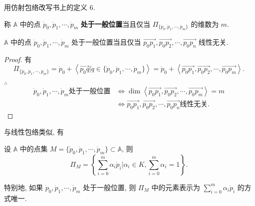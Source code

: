 \documentclass[color=black,device=normal,lang=cn,mode=geye]{elegantnote}
\begin{document}
用仿射包络改写书上的定义 6.
\begin{definition}[书上的定义 6]
    称 $\mathbb{A}$ 中的点 $\dot{p}_0,\dot{p}_1,\cdots,\dot{p}_m$ \textbf{处于一般位置}当且仅当 $\varPi_{\{\dot{p}_0,\dot{p}_1,\cdots,\dot{p}_m\}}$ 的维数为 $m$.
\end{definition}
\begin{theorem}
    $\mathbb{A}$ 中的点 $\dot{p}_0,\dot{p}_1,\cdots,\dot{p}_m$ 处于一般位置当且仅当 $\overrightarrow{p_0p_1},\overrightarrow{p_0p_2},\cdots,\overrightarrow{p_0p_n}$ 线性无关.
\end{theorem}
\begin{proof}
    有
    \[\varPi_{\{\dot{p}_0,\dot{p}_1,\cdots,\dot{p}_m\}}=\dot{p}_0+\left<\overrightarrow{p_0q}|\dot{q}\in\{\dot{p}_0,\dot{p}_1,\cdots,\dot{p}_m\}\right>=\dot{p}_0+\left<\overrightarrow{p_0p_1},\overrightarrow{p_0p_2},\cdots,\overrightarrow{p_0p_m}\right>.\]
    
    $\therefore$
    \begin{align*}
        \dot{p}_0,\dot{p}_1,\cdots,\dot{p}_m\text{处于一般位置} & \Leftrightarrow\dim\left<\overrightarrow{p_0p_1},\overrightarrow{p_0p_2},\cdots,\overrightarrow{p_0p_m}\right>=m \\
        & \Leftrightarrow\overrightarrow{p_0p_1},\overrightarrow{p_0p_2},\cdots,\overrightarrow{p_0p_n}\text{线性无关}.
    \end{align*}
\end{proof}
与线性包络类似, 有
\begin{theorem}
    设 $\mathbb{A}$ 中的点集 $M=\{\dot{p}_0,\dot{p}_1,\cdots,\dot{p}_m\}\subset\mathbb{A}$, 则
    \[\varPi_M=\left\{\sum\limits_{i=0}^m\alpha_i\dot{p}_i\bigg|\alpha_i\in K,\sum\limits_{i=0}^m\alpha_i=1\right\}.\]

    特别地, 如果 $\dot{p}_0,\dot{p}_1,\cdots,\dot{p}_m$ 处于一般位置, 则 $\varPi_M$ 中的元素表示为 $\sum\limits_{i=0}^m\alpha_i\dot{p}_i$ 的方式唯一.
\end{theorem}
\end{document}
